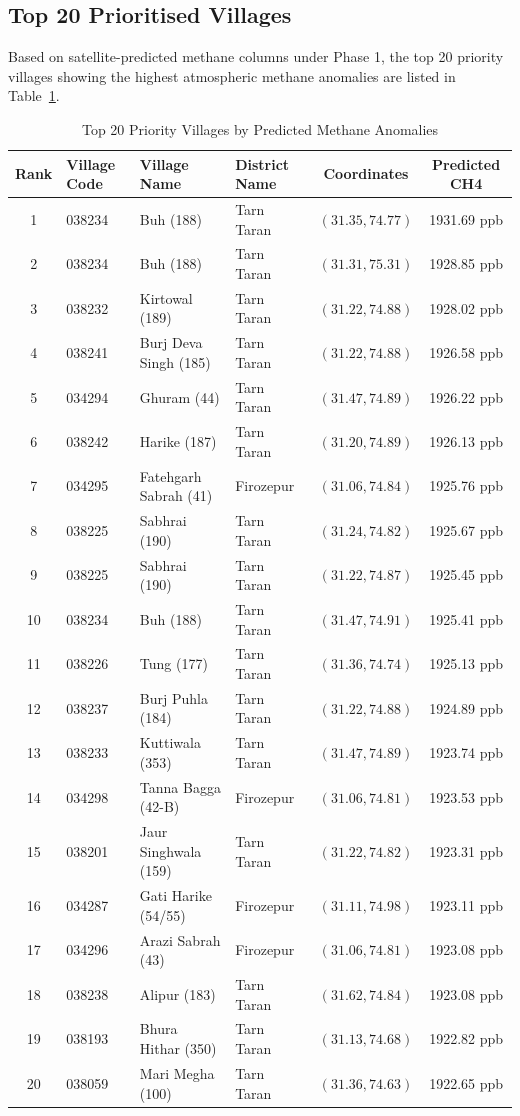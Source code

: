 \documentclass[12pt,a4paper]{report}
\begin{document}
\subsection{Top 20 Prioritised Villages}
Based on satellite-predicted methane columns under Phase 1, the top 20 priority villages showing the highest atmospheric methane anomalies are listed in Table~\ref{tab:top_20_villages}.

\begin{table}[H]
\centering
\caption{Top 20 Priority Villages by Predicted Methane Anomalies}
\label{tab:top_20_villages}
\begin{tabular}{clllcc}
\toprule
\textbf{Rank} & \textbf{Village Code} & \textbf{Village Name} & \textbf{District Name} & \textbf{Coordinates} & \textbf{Predicted CH4} \\
\midrule
1 & 038234 & Buh (188) & Tarn Taran & $(31.35, 74.77)$ & 1931.69 ppb \\
2 & 038234 & Buh (188) & Tarn Taran & $(31.31, 75.31)$ & 1928.85 ppb \\
3 & 038232 & Kirtowal (189) & Tarn Taran & $(31.22, 74.88)$ & 1928.02 ppb \\
4 & 038241 & Burj Deva Singh (185) & Tarn Taran & $(31.22, 74.88)$ & 1926.58 ppb \\
5 & 034294 & Ghuram (44) & Tarn Taran & $(31.47, 74.89)$ & 1926.22 ppb \\
6 & 038242 & Harike (187) & Tarn Taran & $(31.20, 74.89)$ & 1926.13 ppb \\
7 & 034295 & Fatehgarh Sabrah (41) & Firozepur & $(31.06, 74.84)$ & 1925.76 ppb \\
8 & 038225 & Sabhrai (190) & Tarn Taran & $(31.24, 74.82)$ & 1925.67 ppb \\
9 & 038225 & Sabhrai (190) & Tarn Taran & $(31.22, 74.87)$ & 1925.45 ppb \\
10 & 038234 & Buh (188) & Tarn Taran & $(31.47, 74.91)$ & 1925.41 ppb \\
11 & 038226 & Tung (177) & Tarn Taran & $(31.36, 74.74)$ & 1925.13 ppb \\
12 & 038237 & Burj Puhla (184) & Tarn Taran & $(31.22, 74.88)$ & 1924.89 ppb \\
13 & 038233 & Kuttiwala (353) & Tarn Taran & $(31.47, 74.89)$ & 1923.74 ppb \\
14 & 034298 & Tanna Bagga (42-B) & Firozepur & $(31.06, 74.81)$ & 1923.53 ppb \\
15 & 038201 & Jaur Singhwala (159) & Tarn Taran & $(31.22, 74.82)$ & 1923.31 ppb \\
16 & 034287 & Gati Harike (54/55) & Firozepur & $(31.11, 74.98)$ & 1923.11 ppb \\
17 & 034296 & Arazi Sabrah (43) & Firozepur & $(31.06, 74.81)$ & 1923.08 ppb \\
18 & 038238 & Alipur (183) & Tarn Taran & $(31.62, 74.84)$ & 1923.08 ppb \\
19 & 038193 & Bhura Hithar (350) & Tarn Taran & $(31.13, 74.68)$ & 1922.82 ppb \\
20 & 038059 & Mari Megha (100) & Tarn Taran & $(31.36, 74.63)$ & 1922.65 ppb \\
\bottomrule
\end{tabular}
\end{table}
\end{document}
